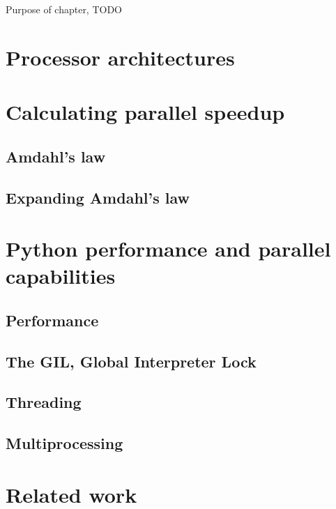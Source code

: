 
Purpose of chapter, TODO

\section{Processor architectures}
\section{Calculating parallel speedup}
\subsection{Amdahl's law}
\subsection{Expanding Amdahl's law}

\section{Python performance and parallel capabilities}
\subsection{Performance}
\subsection{The GIL, Global Interpreter Lock}
\subsection{Threading}
\subsection{Multiprocessing}
\section{Related work}

